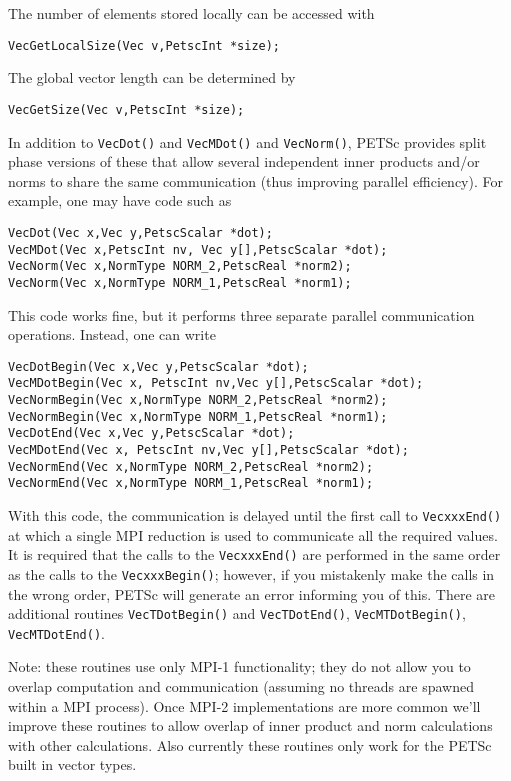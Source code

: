 The number of elements stored locally can be accessed with
\begin{lstlisting}
VecGetLocalSize(Vec v,PetscInt *size);
\end{lstlisting}
The global vector length can be determined by
\begin{lstlisting}
VecGetSize(Vec v,PetscInt *size);
\end{lstlisting}

In addition to \lstinline{VecDot()} and \lstinline{VecMDot()} and \lstinline{VecNorm()}, PETSc provides
split phase versions of these that allow several independent inner products and/or norms
to share the same communication (thus improving parallel efficiency). For example,
one may have code such as
\begin{lstlisting}
VecDot(Vec x,Vec y,PetscScalar *dot);
VecMDot(Vec x,PetscInt nv, Vec y[],PetscScalar *dot);
VecNorm(Vec x,NormType NORM_2,PetscReal *norm2);
VecNorm(Vec x,NormType NORM_1,PetscReal *norm1);
\end{lstlisting}
This code works fine, but it performs three separate parallel communication
operations. Instead, one can write
\begin{lstlisting}
VecDotBegin(Vec x,Vec y,PetscScalar *dot);
VecMDotBegin(Vec x, PetscInt nv,Vec y[],PetscScalar *dot);
VecNormBegin(Vec x,NormType NORM_2,PetscReal *norm2);
VecNormBegin(Vec x,NormType NORM_1,PetscReal *norm1);
VecDotEnd(Vec x,Vec y,PetscScalar *dot);
VecMDotEnd(Vec x, PetscInt nv,Vec y[],PetscScalar *dot);
VecNormEnd(Vec x,NormType NORM_2,PetscReal *norm2);
VecNormEnd(Vec x,NormType NORM_1,PetscReal *norm1);
\end{lstlisting}
With this code,
the communication is delayed until the first call to
\lstinline{VecxxxEnd()} at which
a single MPI reduction is used to communicate all the required values. It is required that the
calls to the \lstinline{VecxxxEnd()} are performed in the same order as the calls to the
\lstinline{VecxxxBegin()}; however, if you mistakenly make the calls in the wrong order, PETSc
will generate an error
informing you of this. There are additional routines \lstinline{VecTDotBegin()} and
\lstinline{VecTDotEnd()}, \lstinline{VecMTDotBegin()}, \lstinline{VecMTDotEnd()}.

Note: these routines use only MPI-1 functionality; they do not allow you to overlap
computation and communication (assuming no threads are spawned within a MPI process).
Once MPI-2 implementations are more common we'll improve these
routines to allow overlap of inner product and norm calculations with other calculations. 
Also currently these routines only work for the PETSc built in vector types. 


